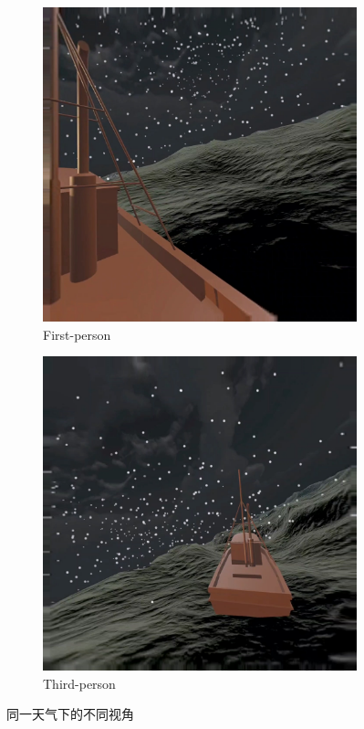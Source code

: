 \documentclass[a4paper,10pt]{article}
\begin{document}
\begin{figure}[htbp]
			\begin{subfigure}{0.45\textwidth}
				\includegraphics[width=\linewidth]{picture/First-person perspective Hail-IP}
				\captionsetup{font=scriptsize}
				\caption{First-person}
				\label{fig: First-person perspective Hail-IP}
			\end{subfigure}
			\begin{subfigure}{0.45\textwidth}
				\includegraphics[width=\linewidth]{picture/Third-person perspective another hail-IP1}
				\captionsetup{font=scriptsize}
				\caption{Third-person}
				\label{fig: Third-person perspective another hail-IP1}
			\end{subfigure}
			\captionsetup{font=scriptsize}
			\caption{
				\label{fig: View}	
				同一天气下的不同视角					
			}
		\end{figure}
		
\end{document}
